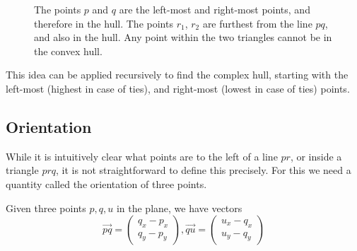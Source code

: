 \begin{figure}[ht]
{
    }
    \caption{The points $p$ and $q$ are the left-most and 
             right-most points, and therefore in the hull. The points $r_1$,
             $r_2$ are furthest from the line $pq$, and also in the hull. Any
             point within the two triangles cannot be in the convex hull.}
    \label{fig:quickhull}
\end{figure}

This idea can be applied recursively to find the complex hull, starting with
the left-most (highest in case of ties), and right-most (lowest in case of ties)
points.

\subsection{Orientation}

While it is intuitively clear what points are to the left of a line $pr$, or
inside a triangle $prq$, it is not straightforward to define this precisely.
For this we need a quantity called the orientation of three points.

Given three points $p, q, u$ in the plane, we have vectors
\[
    \vec{pq} = \begin{pmatrix}
        q_x - p_x \\
        q_y - p_y
    \end{pmatrix},
    \vec{qu} = \begin{pmatrix}
        u_x - q_x \\
        u_y - q_y
    \end{pmatrix}
\]

